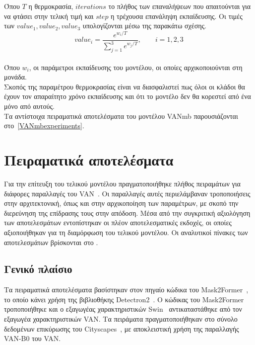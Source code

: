 \documentclass[12pt]{article}
\numberwithin{equation}{section}
\begin{document}
\noindent Όπου \(T\) η θερμοκρασία, \(iterations\) το πλήθος των επαναλήψεων που απαιτούνται για να φτάσει στην τελική τιμή και \(step\) η τρέχουσα επανάληψη εκπαίδευσης. Οι τιμές των \(value_1, value_2, value_3\) υπολογίζονται μέσω της παρακάτω σχέσης.\\

\begin{equation}
value_i = \frac{e^{w_i / T}}{\sum_{j=1}^{3} e^{w_j / T}}, \qquad i = 1,2,3
\end{equation}\\

\noindent Όπου \(w_i\), οι παράμετροι εκπαίδευσης του μοντέλου, οι οποίες αρχικοποιούνται στη μονάδα.\\

Σκοπός της παραμέτρου θερμοκρασίας είναι να διασφαλιστεί πως όλοι οι κλάδοι θα έχουν τον απαραίτητο χρόνο εκπαίδευσης και ότι το μοντέλο δεν θα κορεστεί από ένα μόνο από αυτούς.\\

\noindent Τα αντίστοιχα πειραματικά αποτελέσματα του μοντέλου VANmb παρουσιάζονται στο~\ref{VANmbexperiments}.

\newpage
\mbox{}
\newpage

\section{Πειραματικά αποτελέσματα}

Για την επίτευξη του τελικού μοντέλου πραγματοποιήθηκε πλήθος πειραμάτων για διάφορες παραλλαγές του VAN~\cite{guo2022visualattentionnetwork}. Οι παραλλαγές αυτές περιελάμβαναν τροποποιήσεις στην αρχιτεκτονική, όπως και στην αρχικοποίηση των παραμέτρων, με σκοπό την διερεύνηση της επίδρασης τους στην απόδοση. Μέσα από την συγκριτική αξιολόγηση των αποτελεσμάτων εντοπίστηκαν οι πλέον αποτελεσματικές εκδοχές, οι οποίες αξιοποιήθηκαν για τη διαμόρφωση του τελικού μοντέλου. Οι αναλυτικοί πίνακες των αποτελεσμάτων βρίσκονται στο .

\subsection{Γενικό πλαίσιο}

Τα πειραματικά αποτελέσματα 	βασίστηκαν στον πηγαίο κώδικα του Mask2Former~\cite{cheng2022maskedattentionmasktransformeruniversal}, το οποίο κάνει χρήση της βιβλιοθήκης Detectron2~\cite{wu2019detectron2}. Ο κώδικας του Mask2Former τροποποιήθηκε και ο εξαγωγέας χαρακτηριστικών Swin~\cite{liu2021swintransformerhierarchicalvision} αντικαταστάθηκε από τον εξαγωγέα χαρακτηριστικών VAN. Τα πειράματα πραγματοποιήθηκαν στο σύνολο δεδομένων επικύρωσης του Cityscapes~\cite{DBLP:journals/corr/CordtsORREBFRS16}, με αποκλειστική χρήση της παραλλαγής VAN-B0 του VAN.
\end{document}

